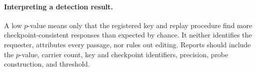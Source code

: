 \paragraph{Interpreting a detection result.}
A low $p$-value means only that the registered key and replay procedure find more
checkpoint-consistent responses than expected by chance. It neither identifies the requester,
attributes every passage, nor rules out editing. Reports should include the $p$-value, carrier count,
key and checkpoint identifiers, precision, probe construction, and threshold.

